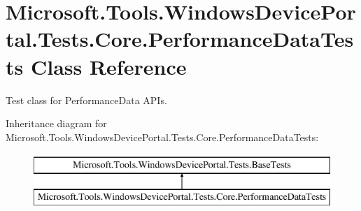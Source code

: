 \hypertarget{class_microsoft_1_1_tools_1_1_windows_device_portal_1_1_tests_1_1_core_1_1_performance_data_tests}{}\section{Microsoft.\+Tools.\+Windows\+Device\+Portal.\+Tests.\+Core.\+Performance\+Data\+Tests Class Reference}
\label{class_microsoft_1_1_tools_1_1_windows_device_portal_1_1_tests_1_1_core_1_1_performance_data_tests}


Test class for Performance\+Data A\+P\+Is.  


Inheritance diagram for Microsoft.\+Tools.\+Windows\+Device\+Portal.\+Tests.\+Core.\+Performance\+Data\+Tests\+:\begin{figure}[H]
\begin{center}
\leavevmode
\includegraphics[height=2.000000cm]{class_microsoft_1_1_tools_1_1_windows_device_portal_1_1_tests_1_1_core_1_1_performance_data_tests}
\end{center}
\end{figure}

